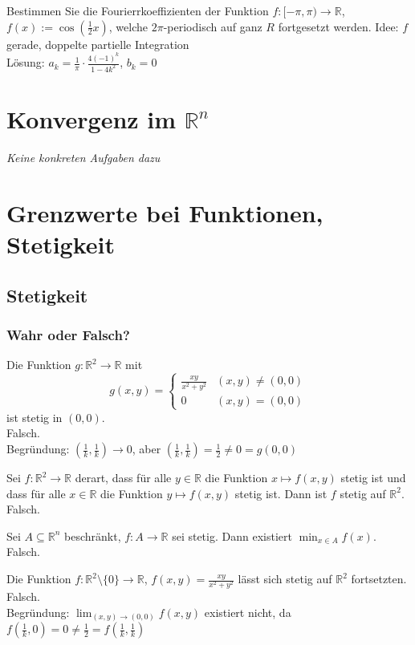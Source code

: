 \documentclass[parskip=full]{scrartcl}
\begin{document}
Bestimmen Sie die Fourierrkoeffizienten der Funktion $f : [-\pi, \pi) \to \mathbb{R}$, $f(x) := \cos\left(\frac{1}{2}x\right)$, welche $2\pi$-periodisch auf ganz $R$ fortgesetzt werden.
Idee: $f$ gerade, doppelte partielle Integration\\
Lösung: $a_k = \frac{1}{\pi} \cdot \frac{4(-1)^k}{1-4k^2}$, $b_k = 0$

\section{Konvergenz im $\mathbb{R}^n$}
\textit{Keine konkreten Aufgaben dazu}

\section{Grenzwerte bei Funktionen, Stetigkeit}
\subsection{Stetigkeit}
\subsubsection{Wahr oder Falsch?}
Die Funktion $g : \mathbb{R}^2 \to \mathbb{R}$ mit
\begin{displaymath}
  g(x,y) =
  \begin{cases}
    \frac{xy}{x^2 + y^2}& (x,y) \neq (0,0)\\
    0& (x,y) = (0,0)
  \end{cases}
\end{displaymath}
ist stetig in $(0,0)$.\\
Falsch.\\
Begründung: $\left(\frac{1}{k}, \frac{1}{k}\right) \to 0$, aber $\left(\frac{1}{k}, \frac{1}{k}\right) = \frac{1}{2} \neq 0 = g(0,0)$

Sei $f: \mathbb{R}^2 \to \mathbb{R}$ derart, dass für alle $y \in \mathbb{R}$ die Funktion $x \mapsto f(x,y)$ stetig ist und dass für alle $x \in \mathbb{R}$ die Funktion $y \mapsto f(x,y)$ stetig ist.
Dann ist $f$ stetig auf $\mathbb{R}^2$.\\
Falsch.

Sei $A \subseteq \mathbb{R}^n$ beschränkt, $f : A \to \mathbb{R}$ sei stetig.
Dann existiert $\min_{x \in A} f(x)$.\\
Falsch.

Die Funktion $f : \mathbb{R}^2 \setminus \{0\} \to \mathbb{R}$, $f(x,y) = \frac{xy}{x^2 + y^2}$ lässt sich stetig auf $\mathbb{R}^2$ fortsetzten.\\
Falsch.\\
Begründung: $\lim_{(x,y) \to (0,0)} f(x,y)$ existiert nicht, da $f\left(\frac{1}{k}, 0\right) = 0 \neq \frac{1}{2} = f\left(\frac{1}{k}, \frac{1}{k}\right)$
\end{document}
